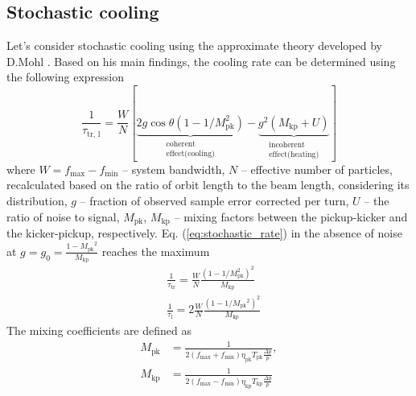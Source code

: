 \documentclass[submitting]{nst}
\begin{document}
	\subsection{Stochastic cooling}
	\par Let's consider stochastic cooling using the approximate theory developed by D.Mohl \cite{b5, b6}. Based on his main findings, the cooling rate can be determined using the following expression
	\begin{equation}
		\frac{1}{\tau_{\textrm{tr, l}}}=\frac{W}{N}[\underbrace{2 g \cos \theta\left(1-1 / M_{\textrm{pk}}^2\right)}_{\begin{array}{c}
				\text { coherent } \\
				\text { effect(cooling) }
		\end{array}}-\underbrace{g^2\left(M_{\textrm{kp}}+U\right)}_{\begin{array}{c}
				\text { incoherent } \\
				\text { effect(heating) }
		\end{array}}]
		\label{eq:stochastic_rate}
	\end{equation}	
	\noindent where $W=f_{\text{max}}-f_{\text{min}}$ -- system bandwidth, $N$ -- effective number of particles, recalculated based on the ratio of orbit length to the beam length, considering its distribution, $g$ -- fraction of observed sample error corrected per turn, $U$ -- the ratio of noise to signal, $M_{\text{pk}}$, $M_{\text{kp}}$ -- mixing factors between the pickup-kicker and the kicker-pickup, respectively. Eq. (\ref{eq:stochastic_rate}) in the absence of noise at $g=g_0={\frac{1-{M_{\text{pk}}}^2}{M_{\text{kp}}}}$ reaches the maximum
	\begin{equation}
		\begin{aligned}
			& \frac{1}{\tau_{\textrm{tr}}}=\frac{W}{N} \frac{\left(1-1 / M_{\textrm{pk}}^2\right)^2}{M_{\textrm{kp}}} \\
			& \frac{1}{\tau_{\textrm{l}}}=2 \frac{W}{N} \frac{\left(1-1 / M_{\textrm{pk}}{ }^2\right)^2}{M_{\textrm{kp}}}
		\end{aligned} 
		\label{eq:cooling_rate}
	\end{equation}
	\noindent The mixing coefficients are defined as
	\begin{equation}
		\begin{aligned}
			M_{\textrm{pk}} & =\frac{1}{2\left(f_{\max }+f_{\min }\right) \eta_{\textrm{pk}} T_{\textrm{pk}} \frac{\Delta p}{p}}, \\
			M_{\textrm{kp}} & =\frac{1}{2\left(f_{\max }-f_{\min }\right) \eta_{\textrm{kp}} T_{\textrm{kp}} \frac{\Delta p}{p}}
		\end{aligned}
		\label{eq:mixing_coeff}
	\end{equation}
\end{document}
